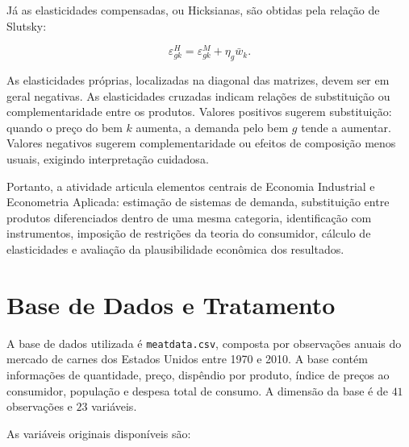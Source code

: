 \documentclass[12pt,a4paper]{article}
\begin{document}
Já as elasticidades compensadas, ou Hicksianas, são obtidas pela relação de Slutsky:

\[
\varepsilon_{gk}^{H}
=
\varepsilon_{gk}^{M}
+
\eta_g \bar{w}_k.
\tag{22}
\label{eq:elasticidade_hicksiana}
\]

As elasticidades próprias, localizadas na diagonal das matrizes, devem ser em geral negativas. As elasticidades cruzadas indicam relações de substituição ou complementaridade entre os produtos. Valores positivos sugerem substituição: quando o preço do bem \(k\) aumenta, a demanda pelo bem \(g\) tende a aumentar. Valores negativos sugerem complementaridade ou efeitos de composição menos usuais, exigindo interpretação cuidadosa.

Portanto, a atividade articula elementos centrais de Economia Industrial e Econometria Aplicada: estimação de sistemas de demanda, substituição entre produtos diferenciados dentro de uma mesma categoria, identificação com instrumentos, imposição de restrições da teoria do consumidor, cálculo de elasticidades e avaliação da plausibilidade econômica dos resultados.

\section{Base de Dados e Tratamento}

A base de dados utilizada é \texttt{meatdata.csv}, composta por observações anuais do mercado de carnes dos Estados Unidos entre 1970 e 2010. A base contém informações de quantidade, preço, dispêndio por produto, índice de preços ao consumidor, população e despesa total de consumo. A dimensão da base é de \(41\) observações e \(23\) variáveis.

As variáveis originais disponíveis são:
\end{document}
